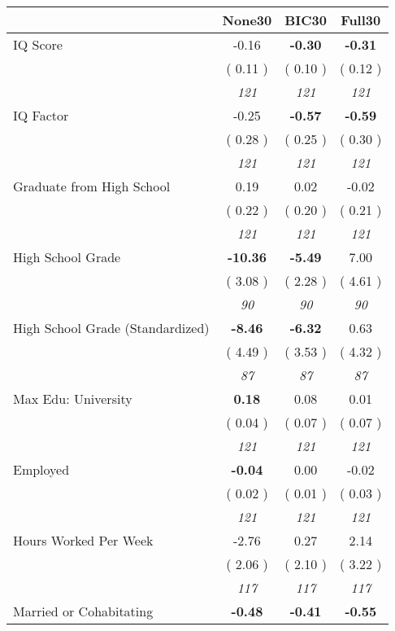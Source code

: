 \begin{tabular}{l c c c}
\toprule
 & None30 & BIC30 & Full30 \\
\midrule
IQ Score &     -0.16 & \textbf{     -0.30 } & \textbf{     -0.31 } \\
& (     0.11 ) & (     0.10 ) & (     0.12 ) \\
& \textit{ 121 } & \textit{ 121 } & \textit{ 121 } \\
IQ Factor &     -0.25 & \textbf{     -0.57 } & \textbf{     -0.59 } \\
& (     0.28 ) & (     0.25 ) & (     0.30 ) \\
& \textit{ 121 } & \textit{ 121 } & \textit{ 121 } \\
Graduate from High School &      0.19 &      0.02 &     -0.02 \\
& (     0.22 ) & (     0.20 ) & (     0.21 ) \\
& \textit{ 121 } & \textit{ 121 } & \textit{ 121 } \\
High School Grade & \textbf{    -10.36 } & \textbf{     -5.49 } &      7.00 \\
& (     3.08 ) & (     2.28 ) & (     4.61 ) \\
& \textit{ 90 } & \textit{ 90 } & \textit{ 90 } \\
High School Grade (Standardized) & \textbf{     -8.46 } & \textbf{     -6.32 } &      0.63 \\
& (     4.49 ) & (     3.53 ) & (     4.32 ) \\
& \textit{ 87 } & \textit{ 87 } & \textit{ 87 } \\
Max Edu: University & \textbf{      0.18 } &      0.08 &      0.01 \\
& (     0.04 ) & (     0.07 ) & (     0.07 ) \\
& \textit{ 121 } & \textit{ 121 } & \textit{ 121 } \\
Employed & \textbf{     -0.04 } &      0.00 &     -0.02 \\
& (     0.02 ) & (     0.01 ) & (     0.03 ) \\
& \textit{ 121 } & \textit{ 121 } & \textit{ 121 } \\
Hours Worked Per Week &     -2.76 &      0.27 &      2.14 \\
& (     2.06 ) & (     2.10 ) & (     3.22 ) \\
& \textit{ 117 } & \textit{ 117 } & \textit{ 117 } \\
Married or Cohabitating & \textbf{     -0.48 } & \textbf{     -0.41 } & \textbf{     -0.55 } \\

\end{tabular}
